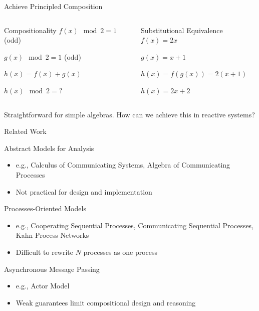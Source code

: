 \documentclass{beamer}
\begin{document}
\begin{frame}{Achieve Principled Composition}

  \begin{columns}
    \begin{column}[T]{.45\textwidth}
      \begin{block}{Compositionality}
        $f(x) \mod 2 = 1$ (odd)

        $g(x) \mod 2 = 1$ (odd)

        $h(x) = f(x) + g(x)$

        $h(x) \mod 2 = ?$
      \end{block}
    \end{column}
    \begin{column}[T]{.45\textwidth}
      \begin{block}{Substitutional Equivalence}
        $f(x) = 2x$

        $g(x) = x+1$

        $h(x) = f(g(x)) = 2(x+1)$

        $h(x) = 2x + 2$
      \end{block}
    \end{column}
  \end{columns}

  \vspace*{24pt}

  \begin{center}
    \LARGE
    Straightforward for simple algebras.  How can we achieve this in reactive systems?
  \end{center}

\end{frame}

\begin{frame}{Related Work}

  Abstract Models for Analysis
  \begin{itemize}
  \item e.g., Calculus of Communicating Systems, Algebra of Communicating Processes
  \item Not practical for design and implementation
  \end{itemize}

  Processes-Oriented Models
  \begin{itemize}
  \item e.g., Cooperating Sequential Processes, Communicating Sequential Processes, Kahn Process Networks
  \item Difficult to rewrite $N$ processes as one process
  \end{itemize}

  Asynchronous Message Passing
  \begin{itemize}
  \item e.g., Actor Model
  \item Weak guarantees limit compositional design and reasoning
  \end{itemize}
\end{frame}
\end{document}
